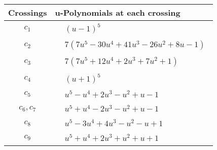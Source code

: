 \documentclass[1p]{elsarticle_modified}
\theoremstyle{definition}
\begin{document}
\begin{tabular}{m{50pt}|m{274pt}}
Crossings & \hspace{64pt}u-Polynomials at each crossing \\
\hline $$\begin{aligned}c_{1}\end{aligned}$$&$\begin{aligned}
&(u-1)^5
\end{aligned}$\\
\hline $$\begin{aligned}c_{2}\end{aligned}$$&$\begin{aligned}
&7(7 u^5-30 u^4+41 u^3-26 u^2+8 u-1)
\end{aligned}$\\
\hline $$\begin{aligned}c_{3}\end{aligned}$$&$\begin{aligned}
&7(7 u^5+12 u^4+2 u^3+7 u^2+1)
\end{aligned}$\\
\hline $$\begin{aligned}c_{4}\end{aligned}$$&$\begin{aligned}
&(u+1)^5
\end{aligned}$\\
\hline $$\begin{aligned}c_{5}\end{aligned}$$&$\begin{aligned}
&u^5- u^4+2 u^3- u^2+u-1
\end{aligned}$\\
\hline $$\begin{aligned}c_{6},c_{7}\end{aligned}$$&$\begin{aligned}
&u^5+u^4-2 u^3- u^2+u-1
\end{aligned}$\\
\hline $$\begin{aligned}c_{8}\end{aligned}$$&$\begin{aligned}
&u^5-3 u^4+4 u^3- u^2- u+1
\end{aligned}$\\
\hline $$\begin{aligned}c_{9}\end{aligned}$$&$\begin{aligned}
&u^5+u^4+2 u^3+u^2+u+1
\end{aligned}$\\

\end{tabular}
\end{document}
